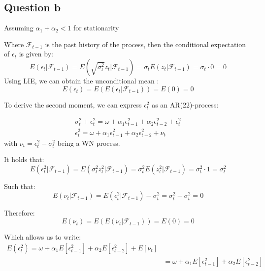 \documentclass{article}
\begin{document}
\subsection*{Question b}

Assuming $\alpha_1 + \alpha_2 < 1$ for stationarity

Where \( \mathcal{F}_{t-1} \) is the past history of the process, then the conditional expectation of \( \epsilon_t \) is given by:
\begin{equation}
	E(\epsilon_t | \mathcal{F}_{t-1}) = E(\sqrt{\sigma^2_t } z_{t}| \mathcal{F}_{t-1}) = \sigma_t E(z_t | \mathcal{F}_{t-1}) = \sigma_t \cdot 0 = 0
\end{equation}
Using LIE, we can obtain the unconditional mean :
\begin{equation}
E(\epsilon_t) = E(E(\epsilon_t | \mathcal{F}_{t-1})) = E(0) = 0
\end{equation}

To derive the second moment, we can express \( \epsilon_t^2 \) as an AR(22)-process:

\begin{align*}
\sigma^2_t + \epsilon^2_{t} = \omega + \alpha_1 \epsilon_{t-1}^2 + \alpha_2 \epsilon_{t-2}^2 + \epsilon^2_{t} \\
\epsilon_t^2 = \omega + \alpha_1 \epsilon_{t-1}^2 + \alpha_2 \epsilon_{t-2}^2 + \nu_t
\end{align*}
with \( \nu_t = \epsilon_t^2 - \sigma_t^2 \) being a WN process.

It holds that:
\begin{equation}
E(\epsilon^2_t | \mathcal{F}_{t-1}) = E(\sigma^2_t  z^2_{t}| \mathcal{F}_{t-1}) = \sigma^2_t E(z^2_t | \mathcal{F}_{t-1}) = \sigma^2_t \cdot 1 = \sigma^2_t
\end{equation}

Such that:
\begin{equation}
E(\nu_t | \mathcal{F}_{t-1}) = E(\epsilon_t^2 | \mathcal{F}_{t-1}) - \sigma_t^2 = \sigma_t^2 - \sigma_t^2 = 0
\end{equation}

Therefore:
\begin{equation}
E(\nu_t) = E(E(\nu_t | \mathcal{F}_{t-1})) = E(0) = 0
\end{equation}

Which allows us to write:
\begin{align*}
E(\epsilon_t^2) = \omega + \alpha_1 E \left[   \epsilon_{t-1}^2 \right] + \alpha_2  E \left[ \epsilon_{t-2}^2 \right] + E \left[ \nu_t \right] \\
&= \omega + \alpha_1 E \left[ \epsilon_{t-1}^2 \right] + \alpha_2  E \left[ \epsilon_{t-2}^2 \right]
\end{align*}
\end{document}
